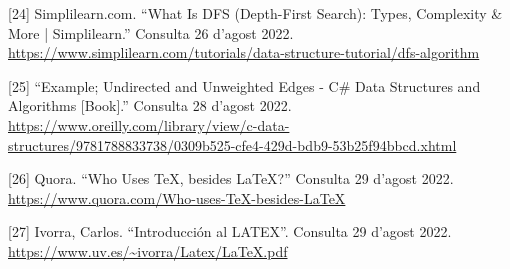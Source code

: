[24] Simplilearn.com. “What Is DFS (Depth-First Search): Types, Complexity \& More | Simplilearn.” Consulta 26 d'agost 2022. 
\href{https://www.simplilearn.com/tutorials/data-structure-tutorial/dfs-algorithm}{https://www.simplilearn.com/tutorials/data-structure-tutorial/dfs-algorithm}

[25] “Example; Undirected and Unweighted Edges - C\# Data Structures and Algorithms [Book].” Consulta 28 d'agost 2022. \url{ https://www.oreilly.com/library/view/c-data-structures/9781788833738/0309b525-cfe4-429d-bdb9-53b25f94bbcd.xhtml}

[26] Quora. “Who Uses TeX, besides LaTeX?” Consulta 29 d'agost 2022. \url{https://www.quora.com/Who-uses-TeX-besides-LaTeX}

[27] Ivorra, Carlos. “Introducción al LATEX”. Consulta 29 d'agost 2022. \url{https://www.uv.es/~ivorra/Latex/LaTeX.pdf}